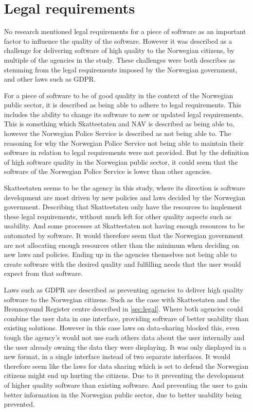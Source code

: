 \section{Legal requirements}
No research mentioned legal requirements for a piece of software as an important factor to influence the quality of the software. However it was described as a challenge for delivering software of high quality to the Norwegian citizens, by multiple of the agencies in the study. These challenges were both describes as stemming from the legal requirements imposed by the Norwegian government, and other laws such as GDPR.

For a piece of software to be of good quality in the context of the Norwegian public sector, it is described as being able to adhere to legal requirements. This includes the ability to change its software to new or updated legal requirements. This is something which Skatteetaten and NAV is described as being able to, however the Norwegian Police Service is described as not being able to. The reasoning for why the Norwegian Police Service not being able to maintain their software in relation to legal requirements were not provided. But by the definition of high software quality in the Norwegian public sector, it could seem that the software of the Norwegian Police Service is lower than other agencies.

Skatteetaten seems to be the agency in this study, where its direction is software development are most driven by new policies and laws decided by the Norwegian government. Describing that Skatteetaten only have the resources to implement these legal requirements, without much left for other quality aspects such as usability. And some processes at Skatteetaten not having enough resources to be automated by software. It would therefore seem that the Norwegian government are not allocating enough resources other than the minimum when deciding on new laws and policies. Ending up in the agencies themselves not being able to create software with the desired quality and fulfilling needs that the user would expect from that software.

Laws such as GDPR are described as preventing agencies to deliver high quality software to the Norwegian citizens. Such as the case with Skatteetaten and the Brønnoysund Register centre described in \autoref{sec:legal}. Where both agencies could combine the user data in one interface, providing software of better usability than existing solutions. However in this case laws on data-sharing blocked this, even tough the agency's would not use each others data about the user internally and the user already owning the data they were displaying. It was only displayed in a new format, in a single interface instead of two separate interfaces. It would therefore seem like the laws for data sharing which is set to defend the Norwegian citizens might end up hurting the citizens. Due to it preventing the development of higher quality software than existing software. And preventing the user to gain better information in the Norwegian public sector, due to better usability being prevented.

